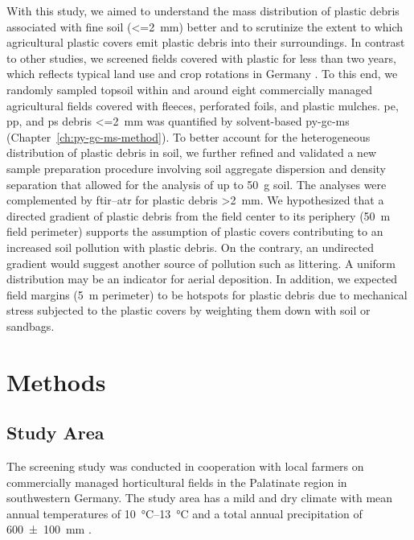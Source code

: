 With this study, we aimed to understand the mass distribution of plastic debris associated with fine soil (\SI{<=2}{\milli\meter}) better and to scrutinize the extent to which agricultural plastic covers emit plastic debris into their surroundings. In contrast to other studies, we screened fields covered with plastic for less than two years, which reflects typical land use and crop rotations in Germany \citep{HarmsAmount2021}.
To this end, we randomly sampled topsoil within and around eight commercially managed agricultural fields covered with fleeces, perforated foils, and plastic mulches. \ac{pe}, \ac{pp}, and \ac{ps} debris \SI{<=2}{\milli\meter} was quantified by solvent-based \ac{py-gc-ms} (Chapter~\ref{ch:py-gc-ms-method}). To better account for the heterogeneous distribution of plastic debris in soil, we further refined and validated a new sample preparation procedure involving soil aggregate dispersion and density separation that allowed for the analysis of up to \SI{50}{\gram} soil. The analyses were complemented by \ac{ftir}--\ac{atr} for plastic debris \SI{>2}{\milli\meter}.
We hypothesized that a directed gradient of plastic debris from the field center to its periphery (\SI{50}{\meter} field perimeter) supports the assumption of plastic covers contributing to an increased soil pollution with plastic debris. On the contrary, an undirected gradient would suggest another source of pollution such as littering. A uniform distribution may be an indicator for aerial deposition. In addition, we expected field margins (\SI{5}{\meter} perimeter) to be hotspots for plastic debris due to mechanical stress subjected to the plastic covers by weighting them down with soil or sandbags.

\section{Methods}

\subsection{Study Area}

The screening study was conducted in cooperation with local farmers on commercially managed horticultural fields in the Palatinate region in southwestern Germany.
The study area has a mild and dry climate with mean annual temperatures of \SIrange{10}{13}{\degreeCelsius} and a total annual precipitation of \SI{600(100)}{\milli\meter} \citep{AgrarmeteorologieRheinland-PfalzWetterdaten2020}.

